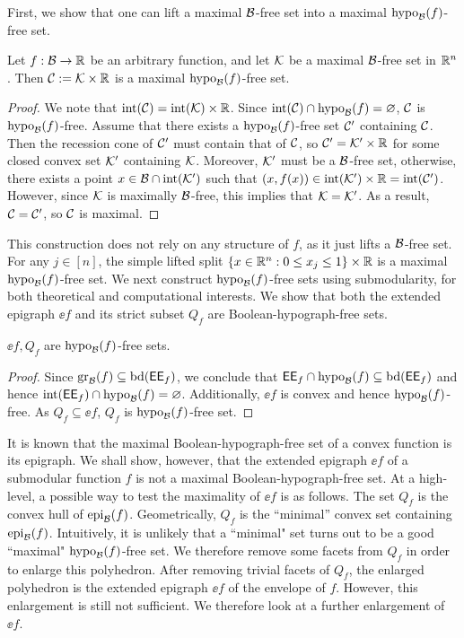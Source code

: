  
 First, we show that one can lift a maximal $\mathcal B$-free set into a  maximal $\operatorname{hypo}_{\mathcal B}(f)$-free  set.
 \begin{theorem}
\label{thm.bin}
Let $f:\mathcal B \to \mathbb R$ be an arbitrary function, and let $\mathcal K$ be a maximal $\mathcal B$-free set in $\mathbb R^n$. Then  $\mathcal C:=\mathcal K \times \mathbb R$ is a maximal $\operatorname{hypo}_{\mathcal B}(f)$-free set.
\end{theorem}
\begin{proof}
We note that $\operatorname{int}(\mathcal C)= \operatorname{int}(\mathcal K) \times \mathbb R$.
 Since $\operatorname{int}(\mathcal C) \cap \operatorname{hypo}_{\mathcal B}(f) = \varnothing$, $\mathcal C$ is $\operatorname{hypo}_{\mathcal B}(f)$-free.
Assume that there exists a $\operatorname{hypo}_{\mathcal B}(f)$-free set $\mathcal C'$ containing $\mathcal C$. Then  the recession cone of $\mathcal C'$ must contain  that of $\mathcal C$, so $\mathcal C' = \mathcal K' \times \mathbb R$ for some closed convex set $\mathcal K'$ containing $\mathcal K$. Moreover, $\mathcal K'$ must be a  $\mathcal B$-free set, otherwise, there exists a point $x \in \mathcal B \cap \operatorname{int}(\mathcal K')$ such that $(x,f(x)) \in \operatorname{int}(\mathcal K') \times \mathbb R = \operatorname{int}(\mathcal C')$. However, since $\mathcal K$ is maximally $\mathcal B$-free, this implies that $\mathcal K = \mathcal K'$. As a result, $\mathcal C = \mathcal C'$, so $\mathcal C$ is maximal.
\end{proof}


 This construction does not rely on any structure of $f$, as it just lifts a $\mathcal B$-free set. For any $j \in [n]$, the simple lifted split $ \{x \in \mathbb R^n: 0 \le x_j \le 1\} \times \mathbb R$ is a maximal $\operatorname{hypo}_{\mathcal B}(f)$-free set. We next construct  $\operatorname{hypo}_{\mathcal B}(f)$-free sets using submodularity, for both theoretical and computational interests. We show that  both the extended epigraph $\ee{f}$ and its strict subset $Q_f$ are Boolean-hypograph-free sets.
\begin{proposition}
\label{cor.free}
$\ee{f}, Q_f$ are $\operatorname{hypo}_{\mathcal B}(f)$-free sets.
\end{proposition}
\begin{proof}
Since $\operatorname{gr}_{\mathcal B}(f) \subseteq \operatorname{bd}(\mathsf{EE}_{f} )$, we conclude that  $\mathsf{EE}_{f}  \cap \operatorname{hypo}_{\mathcal B}(f) \subseteq  \operatorname{bd}(\mathsf{EE}_{f} )$ and hence $\operatorname{int}(\mathsf{EE}_{f} ) \cap \operatorname{hypo}_{\mathcal B}(f) = \varnothing$. Additionally, $\ee{f}$ is convex and hence $\operatorname{hypo}_{\mathcal B}(f)$-free. As $Q_f \subseteq \ee{f}$, $Q_f$ is $\operatorname{hypo}_{\mathcal B}(f)$-free set.
\end{proof}


It is known that the maximal Boolean-hypograph-free set of a convex function is its epigraph. We shall show, however, that the extended epigraph $\ee{f}$ of a submodular function $f$ is not a maximal Boolean-hypograph-free set. At a high-level,  a possible way to test the maximality of $\ee{f}$ is as follows. The set $Q_f$ is  the convex hull of $\operatorname{epi}_{\mathcal B}(f)$. Geometrically,   $Q_f$ is the ``minimal'' convex set containing $\operatorname{epi}_{\mathcal B}(f)$. Intuitively, it is unlikely that a ``minimal" set turns out to be a good ``maximal" $\operatorname{hypo}_{\mathcal B}(f)$-free set. We therefore remove some facets from $Q_f$ in order to enlarge this polyhedron. After removing trivial facets of  $Q_f$,  the enlarged polyhedron is the extended epigraph $\ee{f}$ of the envelope of $f$. However, this enlargement is still not sufficient. We therefore look at a further enlargement of $\ee{f}$.

